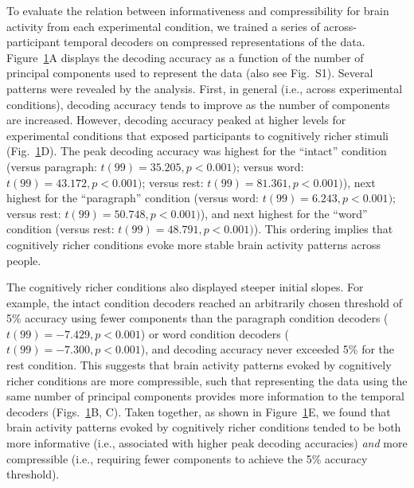 \documentclass[english, 11pt]{article}
\newcommand{\varExplained}{S1}
\begin{document}
\begin{figure}[tp]
\label{fig:inflection}
\end{figure}

To evaluate the relation between informativeness and compressibility for brain
activity from each experimental condition, we trained a series of
across-participant temporal decoders on compressed representations of the data.
Figure~\ref{fig:inflection}A displays the decoding accuracy as a function of
the number of principal components used to represent the data (also see
Fig.~\varExplained). Several patterns were revealed by the analysis. First, in
general (i.e., across experimental conditions), decoding accuracy tends to
improve as the number of components are increased. However, decoding accuracy
peaked at higher levels for experimental conditions that exposed participants
to cognitively richer stimuli (Fig.~\ref{fig:inflection}D). The peak decoding
accuracy was highest for the ``intact'' condition (versus paragraph: $t(99) =
35.205, p < 0.001)$; versus word: $t(99) = 43.172, p < 0.001)$; versus rest:
$t(99) = 81.361, p < 0.001)$), next highest for the ``paragraph'' condition
(versus word: $t(99) = 6.243, p < 0.001)$; versus rest: $t(99) = 50.748, p <
0.001)$), and next highest for the ``word'' condition (versus rest: $t(99) =
48.791, p < 0.001)$). This ordering implies that cognitively richer conditions
evoke more stable brain activity patterns across people.

The cognitively richer conditions also displayed steeper initial slopes. For
example, the intact condition decoders reached an arbitrarily chosen threshold
of 5\% accuracy using fewer components than the paragraph condition decoders
($t(99) = -7.429, p < 0.001$) or word condition decoders ($t(99) = -7.300, p <
0.001$), and decoding accuracy never exceeded 5\% for the rest condition. This
suggests that brain activity patterns evoked by cognitively richer conditions
are more compressible, such that representing the data using the same number of
principal components provides more information to the temporal decoders
(Figs.~\ref{fig:inflection}B, C). Taken together, as shown in
Figure~\ref{fig:inflection}E, we found that brain activity patterns evoked by
cognitively richer conditions tended to be both more informative (i.e.,
associated with higher peak decoding accuracies) \textit{and} more compressible
(i.e., requiring fewer components to achieve the 5\% accuracy threshold).
\end{document}
